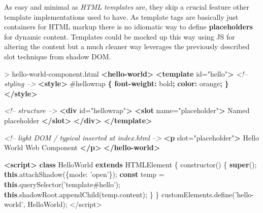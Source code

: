 \documentclass[]{article}
\newenvironment{Shaded}{}{}
\newcommand{\KeywordTok}[1]{\textcolor[rgb]{0.00,0.44,0.13}{\textbf{{#1}}}}
\newcommand{\DataTypeTok}[1]{\textcolor[rgb]{0.56,0.13,0.00}{{#1}}}
\newcommand{\FloatTok}[1]{\textcolor[rgb]{0.25,0.63,0.44}{{#1}}}
\newcommand{\StringTok}[1]{\textcolor[rgb]{0.25,0.44,0.63}{{#1}}}
\newcommand{\SpecialStringTok}[1]{\textcolor[rgb]{0.73,0.40,0.53}{{#1}}}
\newcommand{\CommentTok}[1]{\textcolor[rgb]{0.38,0.63,0.69}{\textit{{#1}}}}
\newcommand{\OtherTok}[1]{\textcolor[rgb]{0.00,0.44,0.13}{{#1}}}
\newcommand{\VariableTok}[1]{\textcolor[rgb]{0.10,0.09,0.49}{{#1}}}
\newcommand{\OperatorTok}[1]{\textcolor[rgb]{0.40,0.40,0.40}{{#1}}}
\newcommand{\AttributeTok}[1]{\textcolor[rgb]{0.49,0.56,0.16}{{#1}}}
\newcommand{\NormalTok}[1]{{#1}}
\begin{document}
As easy and minimal as \emph{HTML templates} are, they skip a crucial
feature other template implementations used to have. As template tags
are basically just containers for HTML markup there is no idiomatic way
to define \textbf{placeholders} for dynamic content. Templates could be
mocked up this way using JS for altering the content but a much cleaner
way leverages the previously described slot technique from shadow DOM.

\begin{Shaded}
\begin{Highlighting}[]
\NormalTok{> hello-world-component.html}
\KeywordTok{<hello-world>}
  \KeywordTok{<template}\OtherTok{ id=}\StringTok{"hello"}\KeywordTok{>}
  \CommentTok{<!-- styling -->}
    \KeywordTok{<style>}
      \FloatTok{#hellowrap} \KeywordTok{\{}
        \KeywordTok{font-weight:} \DataTypeTok{bold}\KeywordTok{;}
        \KeywordTok{color:} \NormalTok{orange}\KeywordTok{;}
      \KeywordTok{\}}
    \KeywordTok{</style>}
    
    \CommentTok{<!-- structure -->}
    \KeywordTok{<div}\OtherTok{ id=}\StringTok{"hellowrap"}\KeywordTok{>}
      \KeywordTok{<slot}\OtherTok{ name=}\StringTok{"placeholder"}\KeywordTok{>}
        \NormalTok{Named placeholder}
      \KeywordTok{</slot>}
    \KeywordTok{</div>}
  \KeywordTok{</template>}
  
  \CommentTok{<!-- light DOM / typical inserted at index.html -->}
  \KeywordTok{<p}\OtherTok{ slot=}\StringTok{"placeholder"}\KeywordTok{>}
    \NormalTok{Hello World Web Component}
  \KeywordTok{</p>}
\KeywordTok{</hello-world>}

\KeywordTok{<script>}
  \KeywordTok{class} \NormalTok{HelloWorld }\KeywordTok{extends} \NormalTok{HTMLElement }\OperatorTok{\{}
    \AttributeTok{constructor}\NormalTok{() }\OperatorTok{\{}
      \KeywordTok{super}\NormalTok{()}\OperatorTok{;}
      \KeywordTok{this}\NormalTok{.}\AttributeTok{attachShadow}\NormalTok{(}\OperatorTok{\{}\DataTypeTok{mode}\OperatorTok{:} \StringTok{'open'}\OperatorTok{\}}\NormalTok{)}\OperatorTok{;}
      \KeywordTok{const} \NormalTok{temp }\OperatorTok{=} \KeywordTok{this}\NormalTok{.}\AttributeTok{querySelector}\NormalTok{(}\StringTok{'template#hello'}\NormalTok{)}\OperatorTok{;}
      \KeywordTok{this}\NormalTok{.}\VariableTok{shadowRoot}\NormalTok{.}\AttributeTok{appendChild}\NormalTok{(}\VariableTok{temp}\NormalTok{.}\AttributeTok{content}\NormalTok{)}\OperatorTok{;}
    \OperatorTok{\}}
  \OperatorTok{\}}
  \VariableTok{customElements}\NormalTok{.}\AttributeTok{define}\NormalTok{(}\StringTok{'hello-world'}\OperatorTok{,} \NormalTok{HelloWorld)}\OperatorTok{;}
\OperatorTok{<}\SpecialStringTok{/script>}
\end{Highlighting}
\end{Shaded}
\end{document}
